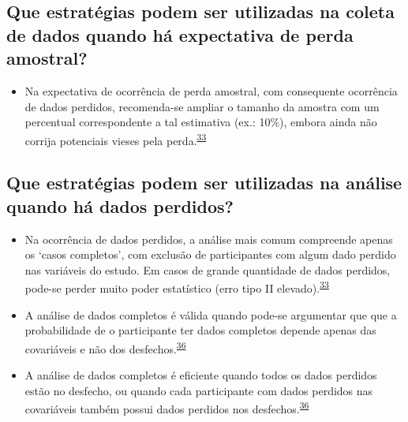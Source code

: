\documentclass[
  a4paper,
]{book}
\providecommand{\tightlist}{%
  \setlength{\itemsep}{0pt}\setlength{\parskip}{0pt}}
\begin{document}
\hypertarget{que-estratuxe9gias-podem-ser-utilizadas-na-coleta-de-dados-quando-huxe1-expectativa-de-perda-amostral}{%
\subsection{Que estratégias podem ser utilizadas na coleta de dados quando há expectativa de perda amostral?}\label{que-estratuxe9gias-podem-ser-utilizadas-na-coleta-de-dados-quando-huxe1-expectativa-de-perda-amostral}}

\begin{itemize}
\tightlist
\item
  Na expectativa de ocorrência de perda amostral, com consequente ocorrência de dados perdidos, recomenda-se ampliar o tamanho da amostra com um percentual correspondente a tal estimativa (ex.: 10\%), embora ainda não corrija potenciais vieses pela perda.\textsuperscript{\protect\hyperlink{ref-Altman2007}{33}}
\end{itemize}

\hypertarget{que-estratuxe9gias-podem-ser-utilizadas-na-anuxe1lise-quando-huxe1-dados-perdidos}{%
\subsection{Que estratégias podem ser utilizadas na análise quando há dados perdidos?}\label{que-estratuxe9gias-podem-ser-utilizadas-na-anuxe1lise-quando-huxe1-dados-perdidos}}

\begin{itemize}
\item
  Na ocorrência de dados perdidos, a análise mais comum compreende apenas os `casos completos', com exclusão de participantes com algum dado perdido nas variáveis do estudo. Em casos de grande quantidade de dados perdidos, pode-se perder muito poder estatístico (erro tipo II elevado).\textsuperscript{\protect\hyperlink{ref-Altman2007}{33}}
\item
  A análise de dados completos é válida quando pode-se argumentar que que a probabilidade de o participante ter dados completos depende apenas das covariáveis e não dos desfechos.\textsuperscript{\protect\hyperlink{ref-carpenter2021}{36}}
\item
  A análise de dados completos é eficiente quando todos os dados perdidos estão no desfecho, ou quando cada participante com dados perdidos nas covariáveis também possui dados perdidos nos desfechos.\textsuperscript{\protect\hyperlink{ref-carpenter2021}{36}}
\end{itemize}
\end{document}

